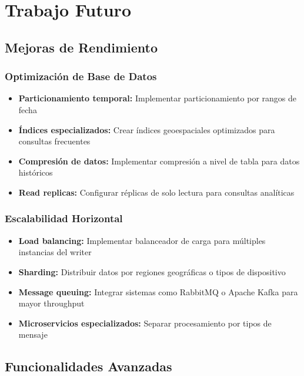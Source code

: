 \section{Trabajo Futuro}

\subsection{Mejoras de Rendimiento}

\subsubsection{Optimización de Base de Datos}
\begin{itemize}
    \item \textbf{Particionamiento temporal:} Implementar particionamiento por rangos de fecha
    \item \textbf{Índices especializados:} Crear índices geoespaciales optimizados para consultas frecuentes
    \item \textbf{Compresión de datos:} Implementar compresión a nivel de tabla para datos históricos
    \item \textbf{Read replicas:} Configurar réplicas de solo lectura para consultas analíticas
\end{itemize}

\subsubsection{Escalabilidad Horizontal}
\begin{itemize}
    \item \textbf{Load balancing:} Implementar balanceador de carga para múltiples instancias del writer
    \item \textbf{Sharding:} Distribuir datos por regiones geográficas o tipos de dispositivo
    \item \textbf{Message queuing:} Integrar sistemas como RabbitMQ o Apache Kafka para mayor throughput
    \item \textbf{Microservicios especializados:} Separar procesamiento por tipos de mensaje
\end{itemize}

\subsection{Funcionalidades Avanzadas}

